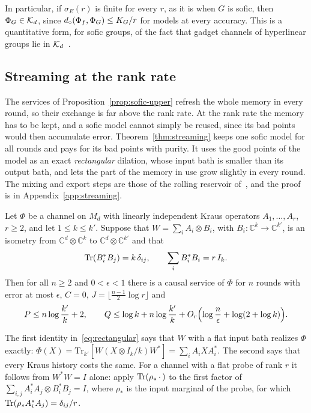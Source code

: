 In particular, if $\sigma_E(r)$ is finite for every $r$, as it is when $G$ is sofic, then $\Phi_G\in\mathcal K_d$, since
$d_\diamond(\Phi_f,\Phi_G)\le K_G/r$ for models at every accuracy. This is a quantitative form, for sofic groups, of the fact that gadget channels of
hyperlinear groups lie in $\mathcal K_d$~\cite{DouglasMghirbiB}.

\subsection{Streaming at the rank rate}\label{sec:streaming}

The services of Proposition~\ref{prop:sofic-upper} refresh the whole memory in every round, so their exchange is far above the rank rate. At
the rank rate the memory has to be kept, and a sofic model cannot simply be reused, since its bad points would then accumulate error.
Theorem~\ref{thm:streaming} keeps one sofic model for all rounds and pays for its bad points with purity. It uses the good points of the model
as an exact \emph{rectangular} dilation, whose input bath is smaller than its output bath, and lets the part of the memory in use grow slightly
in every round. The mixing and export steps are those of the rolling reservoir of~\cite[Appendix~A]{DouglasMghirbiB}, and the proof is in
Appendix~\ref{app:streaming}.

\begin{theorem}\label{thm:streaming}
Let $\Phi$ be a channel on $M_d$ with linearly independent Kraus operators $A_1,\dots,A_r$, $r\ge2$, and let $1\le k\le k'$. Suppose that
$W=\sum_iA_i\otimes B_i$, with $B_i:\mathbb C^k\to\mathbb C^{k'}$, is an isometry from $\mathbb C^d\otimes\mathbb C^k$ to $\mathbb C^d\otimes\mathbb C^{k'}$ and that
\begin{equation}\label{eq:rectangular}
\operatorname{Tr}(B_i^*B_j)=k\,\delta_{ij},\qquad \sum_iB_i^*B_i=r\,I_k .
\end{equation}
Then for all $n\ge2$ and $0<\epsilon<1$ there is a causal service of $\Phi$ for $n$ rounds with error at most $\epsilon$, $C=0$,
$J=\lfloor\frac{n-1}2\log r\rfloor$ and
\[
P\le n\log\frac{k'}k+2,\qquad Q\le\log k+n\log\frac{k'}k+O_r\Bigl(\log\frac n\epsilon+\log(2+\log k)\Bigr).
\]
\end{theorem}

The first identity in~\eqref{eq:rectangular} says that $W$ with a flat input bath realizes $\Phi$ exactly:
$\Phi(X)=\mathrm{Tr}_{k'}[W(X\otimes I_k/k)W^*]=\sum_iA_iXA_i^*$. The second says that every Kraus history costs the same. For a channel with a
flat probe of rank $r$ it follows from $W^*W=I$ alone: apply $\operatorname{Tr}(\rho_*\,\cdot\,)$ to the first factor of $\sum_{i,j}A_i^*A_j\otimes B_i^*B_j=I$,
where $\rho_*$ is the input marginal of the probe, for which $\operatorname{Tr}(\rho_*A_i^*A_j)=\delta_{ij}/r$.

